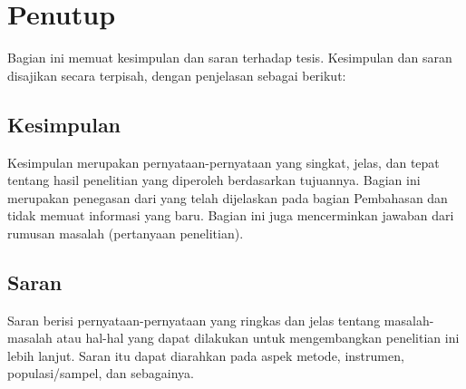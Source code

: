 
\newpage
\chapter{Penutup}

Bagian ini memuat kesimpulan dan saran terhadap tesis. Kesimpulan dan saran disajikan secara terpisah, dengan penjelasan sebagai berikut: 

\section{Kesimpulan}

Kesimpulan merupakan pernyataan-pernyataan yang singkat, jelas, dan tepat tentang hasil penelitian yang diperoleh berdasarkan tujuannya. Bagian ini merupakan penegasan dari yang telah dijelaskan pada bagian Pembahasan dan tidak memuat informasi yang baru. Bagian ini juga mencerminkan jawaban dari rumusan masalah (pertanyaan penelitian).

\section{Saran}

Saran berisi pernyataan-pernyataan yang ringkas dan jelas tentang masalah-masalah atau hal-hal yang dapat dilakukan untuk mengembangkan penelitian ini lebih lanjut. Saran itu dapat diarahkan pada aspek metode, instrumen, populasi/sampel, dan sebagainya.
